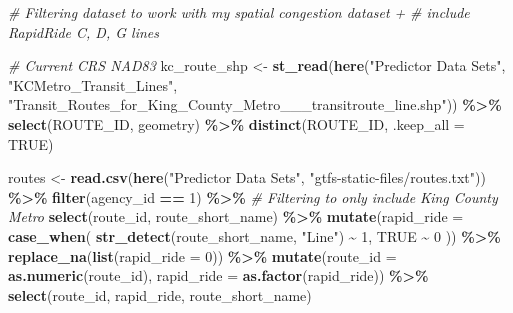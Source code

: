 \documentclass[
  12pt,
]{article}
\newenvironment{Shaded}{\begin{snugshade}}{\end{snugshade}}
\newcommand{\AttributeTok}[1]{\textcolor[rgb]{0.13,0.29,0.53}{#1}}
\newcommand{\CommentTok}[1]{\textcolor[rgb]{0.56,0.35,0.01}{\textit{#1}}}
\newcommand{\ConstantTok}[1]{\textcolor[rgb]{0.56,0.35,0.01}{#1}}
\newcommand{\DecValTok}[1]{\textcolor[rgb]{0.00,0.00,0.81}{#1}}
\newcommand{\FunctionTok}[1]{\textcolor[rgb]{0.13,0.29,0.53}{\textbf{#1}}}
\newcommand{\NormalTok}[1]{#1}
\newcommand{\OtherTok}[1]{\textcolor[rgb]{0.56,0.35,0.01}{#1}}
\newcommand{\SpecialCharTok}[1]{\textcolor[rgb]{0.81,0.36,0.00}{\textbf{#1}}}
\newcommand{\StringTok}[1]{\textcolor[rgb]{0.31,0.60,0.02}{#1}}
\begin{document}
\begin{Shaded}
\begin{Highlighting}[]
\CommentTok{\# Filtering dataset to work with my spatial congestion dataset + }
\CommentTok{\# include RapidRide C, D, G lines}

\CommentTok{\# Current CRS NAD83}
\NormalTok{kc\_route\_shp }\OtherTok{\textless{}{-}} \FunctionTok{st\_read}\NormalTok{(}\FunctionTok{here}\NormalTok{(}\StringTok{"Predictor Data Sets"}\NormalTok{,}
            \StringTok{"KCMetro\_Transit\_Lines"}\NormalTok{,}
            \StringTok{"Transit\_Routes\_for\_King\_County\_Metro\_\_\_transitroute\_line.shp"}\NormalTok{)) }\SpecialCharTok{\%\textgreater{}\%}
  \FunctionTok{select}\NormalTok{(ROUTE\_ID, geometry) }\SpecialCharTok{\%\textgreater{}\%}
  \FunctionTok{distinct}\NormalTok{(ROUTE\_ID, }\AttributeTok{.keep\_all =} \ConstantTok{TRUE}\NormalTok{)}

\NormalTok{routes }\OtherTok{\textless{}{-}} \FunctionTok{read.csv}\NormalTok{(}\FunctionTok{here}\NormalTok{(}\StringTok{"Predictor Data Sets"}\NormalTok{,}
                        \StringTok{"gtfs{-}static{-}files/routes.txt"}\NormalTok{)) }\SpecialCharTok{\%\textgreater{}\%}
  \FunctionTok{filter}\NormalTok{(agency\_id }\SpecialCharTok{==} \DecValTok{1}\NormalTok{) }\SpecialCharTok{\%\textgreater{}\%} \CommentTok{\# Filtering to only include King County Metro}
  \FunctionTok{select}\NormalTok{(route\_id, route\_short\_name) }\SpecialCharTok{\%\textgreater{}\%}
  \FunctionTok{mutate}\NormalTok{(}\AttributeTok{rapid\_ride =} \FunctionTok{case\_when}\NormalTok{(}
    \FunctionTok{str\_detect}\NormalTok{(route\_short\_name, }\StringTok{"Line"}\NormalTok{) }\SpecialCharTok{\textasciitilde{}} \DecValTok{1}\NormalTok{,}
    \ConstantTok{TRUE} \SpecialCharTok{\textasciitilde{}} \DecValTok{0}
\NormalTok{  )) }\SpecialCharTok{\%\textgreater{}\%}
  \FunctionTok{replace\_na}\NormalTok{(}\FunctionTok{list}\NormalTok{(}\AttributeTok{rapid\_ride =} \DecValTok{0}\NormalTok{)) }\SpecialCharTok{\%\textgreater{}\%}
  \FunctionTok{mutate}\NormalTok{(}\AttributeTok{route\_id =} \FunctionTok{as.numeric}\NormalTok{(route\_id),}
         \AttributeTok{rapid\_ride =} \FunctionTok{as.factor}\NormalTok{(rapid\_ride)) }\SpecialCharTok{\%\textgreater{}\%}
  \FunctionTok{select}\NormalTok{(route\_id, rapid\_ride, route\_short\_name)}
\end{Highlighting}
\end{Shaded}
\end{document}
